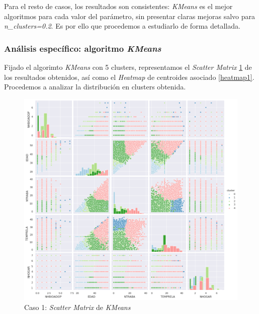 \documentclass[11pt,a4paper]{article}
\begin{document}
	Para el resto de casos, los resultados son consistentes: \emph{KMeans} es el mejor algoritmos para cada valor del parámetro, sin presentar claras mejoras salvo para \emph{n\_clusters=0.2}. Es por ello que procedemos a estudiarlo de forma detallada.
	
	\subsubsection{Análisis específico: algoritmo \emph{KMeans}}
	
	Fijado el algorimto \emph{KMeans} con 5 clusters, representamos el \emph{Scatter Matrix} \ref{scattermatrix1} de los resultados obtenidos, así como el \emph{Heatmap} de centroides asociado \ref{heatmap1}. Procedemos a analizar la distribución en clusters obtenida. \\
	
	\begin{figure}[] 
		\centering
		\includegraphics[scale=0.5]{../Caso1/scatter_matrix}
		\caption{Caso 1: \emph{Scatter Matrix} de \emph{KMeans}}
		\label{scattermatrix1}
	\end{figure}
	
\end{document}
